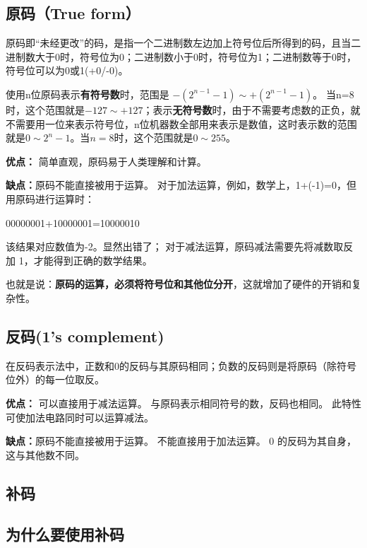 \begin{issues}
\issueDraft
\end{issues}

\subsection{原码（True form）}

原码即“未经更改”的码，是指一个二进制数左边加上符号位后所得到的码，且当二进制数大于0时，符号位为0；二进制数小于0时，符号位为1；二进制数等于0时，符号位可以为0或1(+0/-0)。

使用n位原码表示\textbf{有符号数}时，范围是 $-(2^{n-1}-1)\sim +(2^{n-1}-1)$。 当n=8时，这个范围就是$-127\sim +127 $；表示\textbf{无符号数}时，由于不需要考虑数的正负，就不需要用一位来表示符号位，n位机器数全部用来表示是数值，这时表示数的范围就是$0\sim 2^{n}-1$。当$n=8$时，这个范围就是$0\sim 255$。


\textbf{优点：}
简单直观，原码易于人类理解和计算。

\textbf{缺点：}原码不能直接被用于运算。
对于加法运算，例如，数学上，1+(-1)=0，但用原码进行运算时：


\begin{example}{}
00000001+10000001=10000010
\end{example}


该结果对应数值为-2。显然出错了；
对于减法运算，原码减法需要先将减数取反加 1，才能得到正确的数学结果。

也就是说：\textbf{原码的运算，必须将符号位和其他位分开}，这就增加了硬件的开销和复杂性。

\subsection{反码(1's complement)}

在反码表示法中，正数和0的反码与其原码相同；负数的反码则是将原码（除符号位外）的每一位取反。

\textbf{优点：}
可以直接用于减法运算。
与原码表示相同符号的数，反码也相同。
此特性可使加法电路同时可以运算减法。

\textbf{缺点：}原码不能直接被用于运算。
不能直接用于加法运算。
0 的反码为其自身，这与其他数不同。

\subsection{补码}

\subsection{为什么要使用补码}

